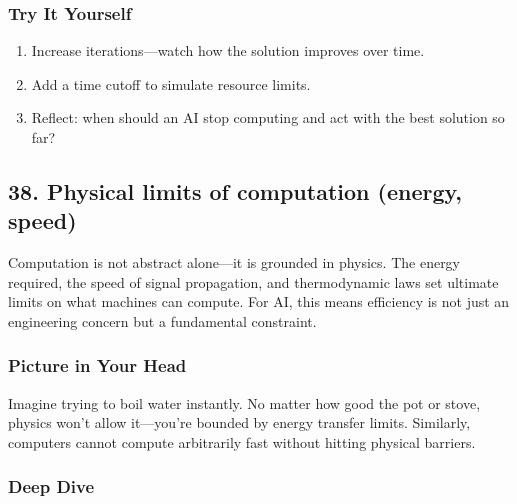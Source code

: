 \documentclass[
  letterpaper,
  DIV=11,
  numbers=noendperiod]{scrreprt}
\providecommand{\tightlist}{%
  \setlength{\itemsep}{0pt}\setlength{\parskip}{0pt}}
\begin{document}
\subsubsection{Try It Yourself}\label{try-it-yourself-36}

\begin{enumerate}
\def\labelenumi{\arabic{enumi}.}
\tightlist
\item
  Increase iterations---watch how the solution improves over time.
\item
  Add a time cutoff to simulate resource limits.
\item
  Reflect: when should an AI stop computing and act with the best
  solution so far?
\end{enumerate}

\subsection{38. Physical limits of computation (energy,
speed)}\label{physical-limits-of-computation-energy-speed}

Computation is not abstract alone---it is grounded in physics. The
energy required, the speed of signal propagation, and thermodynamic laws
set ultimate limits on what machines can compute. For AI, this means
efficiency is not just an engineering concern but a fundamental
constraint.

\subsubsection{Picture in Your Head}\label{picture-in-your-head-37}

Imagine trying to boil water instantly. No matter how good the pot or
stove, physics won't allow it---you're bounded by energy transfer
limits. Similarly, computers cannot compute arbitrarily fast without
hitting physical barriers.

\subsubsection{Deep Dive}\label{deep-dive-37}
\end{document}
